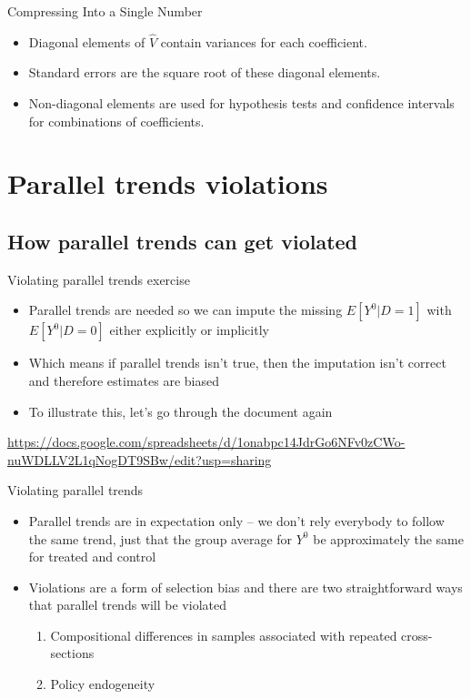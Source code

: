 \documentclass{beamer}
\begin{document}
\begin{frame}{Compressing Into a Single Number}
  \begin{itemize}
    \item Diagonal elements of \( \hat{V} \) contain variances for each coefficient.
    \item Standard errors are the square root of these diagonal elements.
    \item Non-diagonal elements are used for hypothesis tests and confidence intervals for combinations of coefficients.
  \end{itemize}
\end{frame}





\section{Parallel trends violations}

\subsection{How parallel trends can get violated}


\begin{frame}{Violating parallel trends exercise}

\begin{itemize}
\item Parallel trends are needed so we can impute the missing $E[Y^0|D=1]$ with $E[Y^0|D=0]$ either explicitly or implicitly
\item Which means if parallel trends isn't true, then the imputation isn't correct and therefore estimates are biased
\item To illustrate this, let's go through the document again
\end{itemize}

\url{https://docs.google.com/spreadsheets/d/1onabpc14JdrGo6NFv0zCWo-nuWDLLV2L1qNogDT9SBw/edit?usp=sharing}

\end{frame}


\begin{frame}{Violating parallel trends}

\begin{itemize}
\item Parallel trends are in expectation only -- we don't rely everybody to follow the same trend, just that the group average for $Y^0$ be approximately the same for treated and control 
\item Violations are a form of selection bias and there are two straightforward ways that parallel trends will be violated
	\begin{enumerate}
	\item Compositional differences in samples associated with repeated cross-sections
	\item Policy endogeneity
	\end{enumerate}
\end{itemize}

\end{frame}
\end{document}
